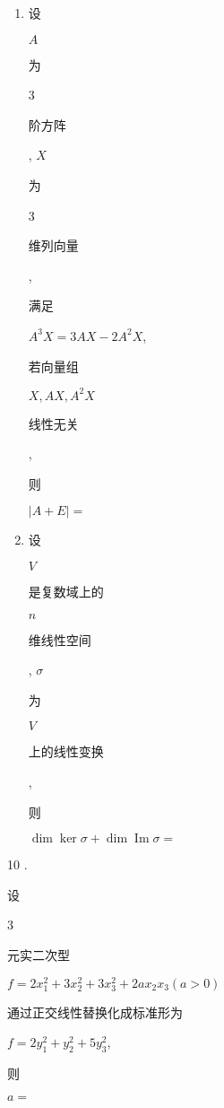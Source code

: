 \documentclass[10pt]{article}
\begin{document}
\begin{enumerate}
  \item \begin{CJK}{UTF8}{mj}设\end{CJK} $A$ \begin{CJK}{UTF8}{mj}为\end{CJK} 3 \begin{CJK}{UTF8}{mj}阶方阵\end{CJK}, $X$ \begin{CJK}{UTF8}{mj}为\end{CJK} 3 \begin{CJK}{UTF8}{mj}维列向量\end{CJK}, \begin{CJK}{UTF8}{mj}满足\end{CJK} $A^{3} X=3 A X-2 A^{2} X$, \begin{CJK}{UTF8}{mj}若向量组\end{CJK} $X, A X, A^{2} X$ \begin{CJK}{UTF8}{mj}线性无关\end{CJK}, \begin{CJK}{UTF8}{mj}则\end{CJK} $|A+E|=$

  \item \begin{CJK}{UTF8}{mj}设\end{CJK} $V$ \begin{CJK}{UTF8}{mj}是复数域上的\end{CJK} $n$ \begin{CJK}{UTF8}{mj}维线性空间\end{CJK}, $\sigma$ \begin{CJK}{UTF8}{mj}为\end{CJK} $V$ \begin{CJK}{UTF8}{mj}上的线性变换\end{CJK}, \begin{CJK}{UTF8}{mj}则\end{CJK} $\operatorname{dim} \operatorname{ker} \sigma+\operatorname{dim} \operatorname{Im} \sigma=$

\end{enumerate}
10 . \begin{CJK}{UTF8}{mj}设\end{CJK} 3 \begin{CJK}{UTF8}{mj}元实二次型\end{CJK} $f=2 x_{1}^{2}+3 x_{2}^{2}+3 x_{3}^{2}+2 a x_{2} x_{3}(a>0)$ \begin{CJK}{UTF8}{mj}通过正交线性替换化成标准形为\end{CJK} $f=2 y_{1}^{2}+y_{2}^{2}+5 y_{3}^{2}$, \begin{CJK}{UTF8}{mj}则\end{CJK} $a=$
\end{document}
